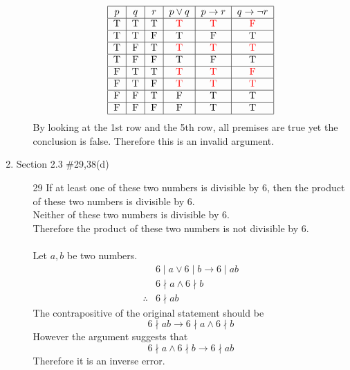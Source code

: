 \documentclass[12pt]{article}
\newcommand{\redt}{\textcolor{red}{T}}
\newcommand{\redf}{\textcolor{red}{F}}
\begin{document}
\begin{enumerate}
\begin{enumerate}
                \[
                \begin{tabular}{|c|c|c|c|c|c|c|}
                    \hline
                    $p$ & $q$ & $r$ & $p \vee q$ & $p \rightarrow r$ & $q \rightarrow \neg r$ \\
                    \hline
                    T & T & T & \redt & \redt & \redf \\
                    \hline
                    T & T & F & T & F & T \\
                    \hline
                    T & F & T & \redt & \redt & \redt \\
                    \hline
                    T & F & F & T & F & T \\
                    \hline
                    F & T & T & \redt & \redt & \redf \\
                    \hline
                    F & T & F & \redt & \redt & \redt \\
                    \hline
                    F & F & T & F & T & T \\
                    \hline
                    F & F & F & F & T & T \\
                    \hline
                    \end{tabular}
                \]
                By looking at the 1st row and the 5th row, all premises are true yet the conclusion is false. Therefore this is an invalid argument. 
            \end{enumerate}
            \newpage

        \item Section 2.3 \#29,38(d)
            \begin{enumerate}
                \item[29] If at least one of these two numbers is divisible by 6, then the product of these two numbers is divisible by 6. \\
                Neither of these two numbers is divisible by 6.\\
                Therefore the product of these two numbers is not divisible by 6.\\
                \\
                Let $a,b$ be two numbers. 
                \begin{align*}
                    & 6 \mid a \vee 6 \mid b \rightarrow 6 \mid ab\\
                    & 6 \nmid a \wedge 6 \nmid b\\
                    \therefore & 6 \nmid ab
                \end{align*} 
                The contrapositive of the original statement should be
                \[
                6 \nmid ab \rightarrow 6 \nmid a \wedge 6 \nmid b
                \]
                However the argument suggests that
                \[
                6 \nmid a \wedge 6 \nmid b \rightarrow 6 \nmid ab 
                \]
                Therefore it is an inverse error. 


\end{enumerate}
\end{enumerate}
\end{document}
